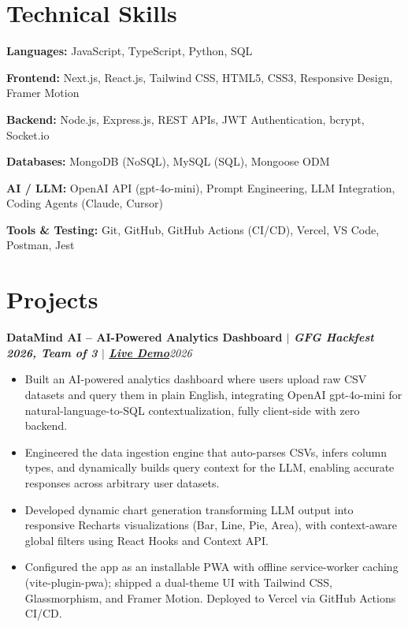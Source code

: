 \documentclass[a4paper,10pt]{article}
\newcommand{\role}[2]{%
  \noindent\textbf{#1}\hfill\textit{\small #2}\par\vspace{1pt}
}
\newcommand{\skillrow}[2]{%
  \noindent\textbf{#1:} #2\par\vspace{1pt}
}
\begin{document}
\section*{Technical Skills}
\skillrow{Languages}{JavaScript, TypeScript, Python, SQL}
\skillrow{Frontend}{Next.js, React.js, Tailwind CSS, HTML5, CSS3, Responsive Design, Framer Motion}
\skillrow{Backend}{Node.js, Express.js, REST APIs, JWT Authentication, bcrypt, Socket.io}
\skillrow{Databases}{MongoDB (NoSQL), MySQL (SQL), Mongoose ODM}
\skillrow{AI / LLM}{OpenAI API (gpt-4o-mini), Prompt Engineering, LLM Integration, Coding Agents (Claude, Cursor)}
\skillrow{Tools \& Testing}{Git, GitHub, GitHub Actions (CI/CD), Vercel, VS Code, Postman, Jest}

\section*{Projects}

\role{DataMind AI -- AI-Powered Analytics Dashboard $\vert$ \textit{GFG Hackfest 2026, Team of 3} $\vert$ \textit{\href{https://data-mind-ai-dash.vercel.app/}{Live Demo}}}{2026}
\begin{itemize}
    \item Built an AI-powered analytics dashboard where users upload raw CSV datasets and query them in plain English, integrating OpenAI gpt-4o-mini for natural-language-to-SQL contextualization, fully client-side with zero backend.
    \item Engineered the data ingestion engine that auto-parses CSVs, infers column types, and dynamically builds query context for the LLM, enabling accurate responses across arbitrary user datasets.
    \item Developed dynamic chart generation transforming LLM output into responsive Recharts visualizations (Bar, Line, Pie, Area), with context-aware global filters using React Hooks and Context API.
    \item Configured the app as an installable PWA with offline service-worker caching (vite-plugin-pwa); shipped a dual-theme UI with Tailwind CSS, Glassmorphism, and Framer Motion. Deployed to Vercel via GitHub Actions CI/CD.
\end{itemize}
\end{document}
